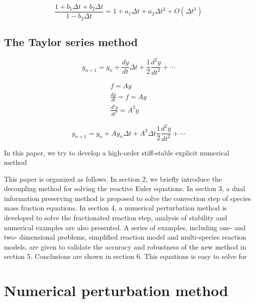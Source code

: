 \documentclass[review]{elsarticle}
\theoremstyle{plain}\newtheorem{definition}{\sc{Definition}}
\theoremstyle{defination}\newtheorem{example}{Example}[section]
\numberwithin{equation}{section}
\numberwithin{table}{section}
\begin{document}
{\begin{equation}
 \frac{ 1+ b_1 \Delta t+ b_2\Delta t}{1-b_2 \Delta t}= 1+a_1 \Delta t +a_2\Delta t^2 +O(\Delta t^3)
  \end{equation}










  \subsection{The Taylor series method}

  \begin{equation}
	y_{n+1} = y_n + \frac{dy}{dt}\Delta t +\frac{1}{2} \frac{d^2y}{dt^2}+\cdots
	\end{equation}

\begin{equation}
\begin{align}
  f= Ay\\
  \frac{dy}{dt}=f=Ay\\
  \frac{d^2y}{dt^2}= A^2y 
\end{align}
  \end{equation}


  \begin{equation}
	y_{n+1} = y_n + A y_n \Delta t + A^2\Delta t \frac{1}{2} \frac{d^2y}{dt^2}+\cdots
	\end{equation}


 In this paper, we try to develop a high-order stiff-stable explicit numerical method 

This paper is organized as follows. In section 2, we briefly introduce the decoupling method for solving the reactive Euler equations. In section 3, a dual information preserving method is proposed to solve the convection step of species mass fraction equations. In section 4, a numerical perturbation method is developed to solve the fractionated reaction step, analysis of stability and numerical examples are also presented. A series of examples, including one- and two- dimensional problems, simplified reaction model and multi-species reaction models, are given to validate the accuracy and robustness of the new method in section 5. Conclusions are shown in section 6.
This equations is easy to solve for  


\section{Numerical perturbation method}

}
\end{document}
